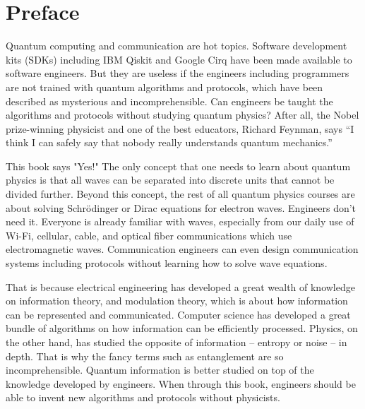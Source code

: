 \documentclass[oneside, letter, 12pt]{book}
\begin{document}



\chapter*{Preface}
Quantum computing and communication are hot topics. Software development kits (SDKs) including IBM Qiskit and Google Cirq have been made available to software engineers. But they are useless if the engineers including programmers are not trained with quantum algorithms and protocols, which have been described as mysterious and incomprehensible. Can engineers be taught the algorithms and protocols without studying quantum physics? After all, the Nobel prize-winning physicist and one of the best educators, Richard Feynman, says “I think I can safely say that nobody really understands quantum mechanics.”

This book says "Yes!" The only concept that one needs to learn about quantum physics is that all waves can be separated into discrete units that cannot be divided further. Beyond this concept, the rest of all quantum physics courses are about solving Schrödinger or Dirac equations for electron waves. Engineers don't need it. Everyone is already familiar with waves, especially from our daily use of Wi-Fi, cellular, cable, and optical fiber communications which use electromagnetic waves. Communication engineers can even design communication systems including protocols without learning how to solve wave equations.

That is because electrical engineering has developed a great wealth of knowledge on information theory, and modulation theory, which is about how information can be represented and communicated. Computer science has developed a great bundle of algorithms on how information can be efficiently processed. Physics, on the other hand, has studied the opposite of information -- entropy or noise -- in depth. That is why the fancy terms such as entanglement are so incomprehensible. Quantum information is better studied on top of the knowledge developed by engineers. When through this book, engineers should be able to invent new algorithms and protocols without physicists.
\end{document}
